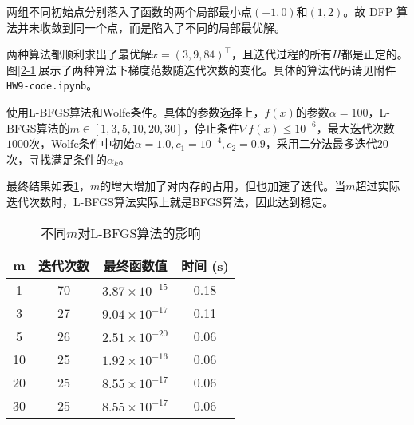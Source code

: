 \documentclass{homework}
\begin{document}
\begin{sol}
两组不同初始点分别落入了函数的两个局部最小点$(-1,0)$和$(1,2)$。故 DFP 算法并未收敛到同一个点，而是陷入了不同的局部最优解。
\end{sol}

\question

\begin{sol}

两种算法都顺利求出了最优解$x = (3,9,84)^\top$，且迭代过程的所有$H$都是正定的。图\ref{2-1}展示了两种算法下梯度范数随迭代次数的变化。具体的算法代码请见附件\texttt{HW9-code.ipynb}。


\end{sol}

\question

\begin{sol}

使用L-BFGS算法和Wolfe条件。具体的参数选择上，$f(x)$的参数$\alpha = 100$，L-BFGS算法的$m\in [1,3,5,10,20,30]$，停止条件$\nabla f(x) \le 10^{-6}$，最大迭代次数$1000$次，Wolfe条件中初始$\alpha = 1.0, c_1 = 10^{-4},c_2=0.9$，采用二分法最多迭代$20$次，寻找满足条件的$\alpha_k$。

最终结果如表\ref{3-1}，$m$的增大增加了对内存的占用，但也加速了迭代。当$m$超过实际迭代次数时，L-BFGS算法实际上就是BFGS算法，因此达到稳定。
\begin{table}[h]
\caption{不同$m$对L-BFGS算法的影响}\label{3-1}
\begin{tabular}{cccc}
\toprule
\textbf{m} & \textbf{迭代次数} & \textbf{最终函数值} & \textbf{时间 (s)} \\
\midrule
1  & 70 & $3.87 \times 10^{-15}$ & 0.18 \\
3  & 27 & $9.04 \times 10^{-17}$ & 0.11 \\
5  & 26 & $2.51 \times 10^{-20}$ & 0.06 \\
10 & 25 & $1.92 \times 10^{-16}$ & 0.06 \\
20 & 25 & $8.55 \times 10^{-17}$ & 0.06 \\
30 & 25 & $8.55 \times 10^{-17}$ & 0.06 \\
\bottomrule
\end{tabular}
\end{table}
\end{sol}

\question 
\end{document}
